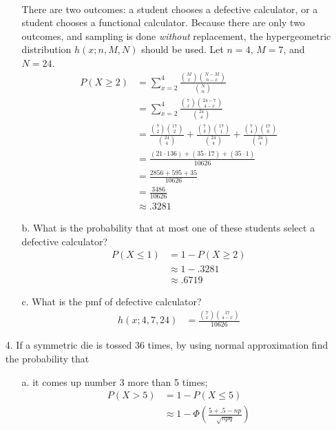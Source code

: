 \documentclass[letterpaper,12pt]{article}
\begin{document}
\begin{enumerate}
\begin{enumerate}
        \\
        There are two outcomes: a student chooses a defective calculator, or a student chooses a functional calculator. Because there are only two outcomes, and sampling is done \textit{without} replacement, the hypergeometric distribution $h(x; n, M, N)$ should be used. Let $n = 4$, $M = 7$, and $N = 24$.
        \begin{align*}
          P(X \ge 2) &= \sum_{x = 2}^{4} \frac{\binom{M}{x} \binom{N - M}{n - x}}{\binom{N}{n}} \\
          &= \sum_{x = 2}^{4} \frac{\binom{7}{x} \binom{24 - 7}{4 - x}}{\binom{24}{4}} \\
          &= \frac{\binom{7}{2} \binom{17}{2}}{\binom{24}{4}} + \frac{\binom{7}{3} \binom{17}{1}}{\binom{24}{4}} + \frac{\binom{7}{4} \binom{17}{0}}{\binom{24}{4}} \\
          &= \frac{(21 \cdot 136) + (35 \cdot 17) + (35 \cdot 1)}{10626} \\
          &= \frac{2856 + 595 + 35}{10626} \\
          &= \frac{3486}{10626} \\
          &\approx .3281
        \end{align*}
      \item[b.]
        What is the probability that at most one of these students select a defective calculator?
        \begin{align*}
          P(X \le 1) &= 1 - P(X \ge 2) \\
          &\approx 1 - .3281 \\
          &\approx .6719
        \end{align*}
      \item[c.]
        What is the pmf of defective calculator?
        \begin{align*}
          h(x; 4, 7, 24) &= \frac{\binom{7}{x} \binom{17}{4 - x}}{10626}
        \end{align*}
    \end{enumerate}
  \item[4.]
    If a symmetric die is tossed 36 times, by using normal approximation find the probability that
    \begin{enumerate}
      \item[a.]
        it comes up number 3 more than 5 times;
        \begin{align*}
          P(X > 5) &= 1 - P(X \le 5) \\
          &\approx 1 - \Phi\left(\frac{5 + .5 - np}{\sqrt{npq}}\right) \\

\end{align*}
\end{enumerate}
\end{enumerate}
\end{document}
